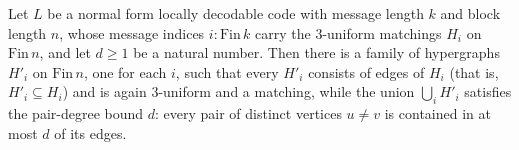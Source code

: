 \begin{theorem}
\label{hypergraph_decomposition}
\leanok
{}
Let $L$ be a normal form locally decodable code with message length $k$ and block length
$n$, whose message indices $i : \mathrm{Fin}\,k$ carry the $3$-uniform matchings $H_i$
on $\mathrm{Fin}\,n$, and let $d \ge 1$ be a natural number. Then there is a family of
hypergraphs $H'_i$ on $\mathrm{Fin}\,n$, one for each $i$, such that every $H'_i$
consists of edges of $H_i$ (that is, $H'_i \subseteq H_i$) and is again $3$-uniform and
a matching, while the union $\bigcup_{i} H'_i$ satisfies the pair-degree bound $d$:
every pair of distinct vertices $u \neq v$ is contained in at most $d$ of its edges.
\end{theorem}
